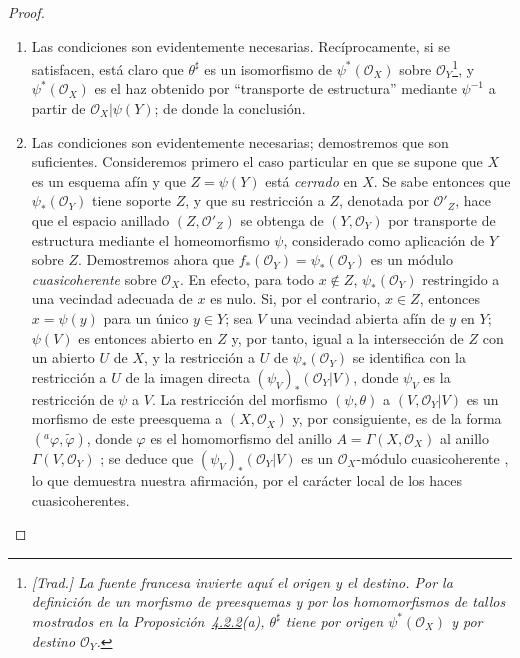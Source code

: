 \documentclass[oneside]{amsart}
\theoremstyle{ega-env-style}
\theoremstyle{ega-thm-env-style}
\theoremstyle{ega-defn-env-style}
\def\mathcal{\mathscr}
\def\sh{\mathcal}                   %
\newcommand{\oldpage}[2][]{{\marginnote{\normalfont{\textbf{#1}~|~#2}}}\ignorespaces}
\begin{document}
\begin{proof}
\medskip\noindent
\begin{enumerate}
  \item[\emph{a)}] Las condiciones son evidentemente necesarias.
    Recíprocamente, si se satisfacen, está claro que $\theta^\sharp$ es un isomorfismo de $\psi^*(\mathscr{O}_X)$ sobre $\mathscr{O}_Y$\footnote{\emph{[Trad.] La fuente francesa invierte aquí el origen y el destino. Por la definición de un morfismo de preesquemas y por los homomorfismos de tallos mostrados en la Proposición~\hyperref[I.4.2.2]{4.2.2}(a), $\theta^\sharp$ tiene por origen $\psi^*(\sh{O}_X)$ y por destino $\sh{O}_Y$.}}, y $\psi^*(\mathscr{O}_X)$ es el haz obtenido por ``transporte de estructura'' mediante $\psi^{-1}$ a partir de $\mathscr{O}_X|\psi(Y)$;
    de donde la conclusión.
  \item[\emph{b)}] Las condiciones son evidentemente necesarias; demostremos que son suficientes.
    Consideremos primero el caso particular en que se supone que $X$ es un esquema afín y que $Z=\psi(Y)$ está \emph{cerrado} en $X$.
    Se sabe entonces  que $\psi_*(\mathscr{O}_Y)$ tiene soporte $Z$, y que su restricción a $Z$, denotada por $\mathscr{O}'_Z$, hace que el espacio anillado $(Z,\mathscr{O}'_Z)$ se obtenga de $(Y,\mathscr{O}_Y)$ por transporte de estructura mediante el homeomorfismo $\psi$, considerado como aplicación de $Y$ sobre $Z$.
    Demostremos ahora que $f_*(\mathscr{O}_Y)=\psi_*(\mathscr{O}_Y)$ es un módulo \emph{cuasicoherente} sobre $\mathscr{O}_X$.
    En efecto, para todo $x\notin Z$, $\psi_*(\mathscr{O}_Y)$ restringido a una vecindad adecuada de $x$ es nulo.
    Si, por el contrario, $x\in Z$, entonces $x=\psi(y)$ para un único $y\in Y$;
    sea $V$ una vecindad abierta afín de $y$ en $Y$;
    $\psi(V)$ es entonces abierto en $Z$ y, por tanto, igual a la intersección de $Z$ con un abierto $U$ de $X$, y la restricción a $U$ de $\psi_*(\mathscr{O}_Y)$ se identifica con la restricción a $U$ de la imagen directa
\oldpage[I]{123}
    $(\psi_V)_*(\mathscr{O}_Y|V)$, donde $\psi_V$ es la restricción de $\psi$ a $V$.
    La restricción del morfismo $(\psi,\theta)$ a $(V,\mathscr{O}_Y|V)$ es un morfismo de este preesquema a $(X,\mathscr{O}_X)$ y, por consiguiente, es de la forma $({}^a\varphi,\widetilde{\varphi})$, donde $\varphi$ es el homomorfismo del anillo $A=\Gamma(X,\mathscr{O}_X)$ al anillo $\Gamma(V,\mathscr{O}_Y)$ ;
    se deduce que $(\psi_V)_*(\mathscr{O}_Y|V)$ es un $\mathscr{O}_X$-módulo cuasicoherente , lo que demuestra nuestra afirmación, por el carácter local de los haces cuasicoherentes.

\end{enumerate}
\end{proof}
\end{document}
